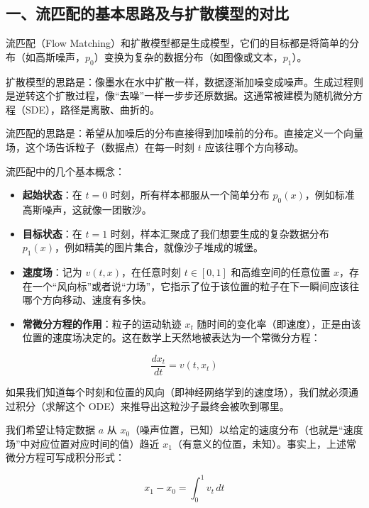\hypertarget{ux4e00ux6d41ux5339ux914dux7684ux57faux672cux601dux8defux53caux4e0eux6269ux6563ux6a21ux578bux7684ux5bf9ux6bd4}{%
\subsection{一、流匹配的基本思路及与扩散模型的对比}\label{ux4e00ux6d41ux5339ux914dux7684ux57faux672cux601dux8defux53caux4e0eux6269ux6563ux6a21ux578bux7684ux5bf9ux6bd4}}

流匹配（Flow Matching）和扩散模型都是生成模型，它们的目标都是将简单的分布（如高斯噪声，\(p_0\)）变换为复杂的数据分布（如图像或文本，\(p_1\)）。

扩散模型的思路是：像墨水在水中扩散一样，数据逐渐加噪变成噪声。生成过程则是逆转这个扩散过程，像``去噪''一样一步步还原数据。这通常被建模为随机微分方程（SDE），路径是离散、曲折的。

流匹配的思路是：希望从加噪后的分布直接得到加噪前的分布。直接定义一个向量场，这个场告诉粒子（数据点）在每一时刻 \(t\) 应该往哪个方向移动。

流匹配中的几个基本概念：

\begin{itemize}
\tightlist
\item
  \textbf{起始状态}：在 \(t=0\) 时刻，所有样本都服从一个简单分布 \(p_0(x)\)，例如标准高斯噪声，这就像一团散沙。
\item
  \textbf{目标状态}：在 \(t=1\) 时刻，样本汇聚成了我们想要生成的复杂数据分布 \(p_1(x)\)，例如精美的图片集合，就像沙子堆成的城堡。
\item
  \textbf{速度场}：记为 \(v(t,x)\)，在任意时刻 \(t\in[0,1]\) 和高维空间的任意位置 \(x\)，存在一个``风向标''或者说``力场''，它指示了位于该位置的粒子在下一瞬间应该往哪个方向移动、速度有多快。
\item
  \textbf{常微分方程的作用}：粒子的运动轨迹 \(x_t\) 随时间的变化率（即速度），正是由该位置的速度场决定的。这在数学上天然地被表达为一个常微分方程：
\end{itemize}

\[
\frac{dx_t}{dt}=v(t,x_t)
\]

如果我们知道每个时刻和位置的风向（即神经网络学到的速度场），我们就必须通过积分（求解这个 ODE）来推导出这粒沙子最终会被吹到哪里。

我们希望让特定数据 \(a\) 从 \(x_0\)（噪声位置，已知）以给定的速度分布（也就是``速度场''中对应位置对应时间的值）趋近 \(x_1\)（有意义的位置，未知）。事实上，上述常微分方程可写成积分形式：

\[
x_1-x_0=\int_0^1 v_t\,dt
\]

